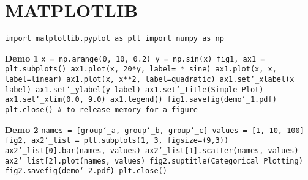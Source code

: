 \section{MATPLOTLIB}

\texttt{import matplotlib.pyplot as plt\newline
import numpy as np}\newline

\textbf{Demo 1}\newline
\texttt{x = np.arange(0, 10, 0.2)\newline
y = np.sin(x)\newline
fig1, ax1 = plt.subplots()\newline
ax1.plot(x, 20*y, label= * sine\textquotesingle)\newline
ax1.plot(x, x, label=\textquotesingle linear\textquotesingle)\newline
ax1.plot(x, x**2, label=\textquotesingle quadratic\textquotesingle)\newline
ax1.set\char`_xlabel(\textquotesingle x label\textquotesingle)\newline
ax1.set\char`_ylabel(\textquotesingle y label\textquotesingle)\newline
ax1.set\char`_title(\textquotesingle Simple Plot\textquotesingle)\newline
ax1.set\char`_xlim(0.0, 9.0)\newline
ax1.legend()\newline
fig1.savefig(\textquotesingle demo\char`_1.pdf\textquotesingle)\newline
plt.close() \# to release memory for a figure}\newline

\textbf{Demo 2}\newline
\texttt{names = [\textquotesingle group\char`_a\textquotesingle, \textquotesingle group\char`_b\textquotesingle, \textquotesingle group\char`_c\textquotesingle]\newline
values = [1, 10, 100]\newline
fig2, ax2\char`_list = plt.subplots(1, 3, figsize=(9,3))\newline
ax2\char`_list[0].bar(names, values)\newline
ax2\char`_list[1].scatter(names, values)\newline
ax2\char`_list[2].plot(names, values)\newline
fig2.suptitle(\textquotesingle Categorical Plotting\textquotesingle)\newline
fig2.savefig(\textquotesingle demo\char`_2.pdf\textquotesingle)\newline
plt.close()}\newline

